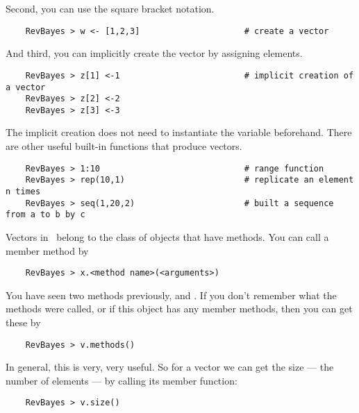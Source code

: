 Second, you can use the square bracket notation.
{\tt \begin{snugshade*}
\begin{lstlisting}    
    RevBayes > w <- [1,2,3]                     # create a vector
\end{lstlisting}
\end{snugshade*}}
And third, you can implicitly create the vector by assigning elements.
{\tt \begin{snugshade*}
\begin{lstlisting}    
    RevBayes > z[1] <-1                         # implicit creation of a vector
    RevBayes > z[2] <-2                   
    RevBayes > z[3] <-3                  
\end{lstlisting}
\end{snugshade*}} 
The implicit creation does not need to instantiate the variable beforehand.
There are other useful built-in functions that produce vectors.
{\tt \begin{snugshade*}
\begin{lstlisting}    
    RevBayes > 1:10                             # range function
    RevBayes > rep(10,1)                        # replicate an element n times
    RevBayes > seq(1,20,2)                      # built a sequence from a to b by c
\end{lstlisting}
\end{snugshade*}} 

Vectors in \Rev~belong to the class of objects that have methods.
You  can call a member method by
{\tt \begin{snugshade*}
\begin{lstlisting}    
    RevBayes > x.<method name>(<arguments>)                 
\end{lstlisting}
\end{snugshade*}} 
You have seen two methods previously,  and .
If you don't remember what the methods were called, or if this object has any member methods, then you can get these by
{\tt \begin{snugshade*}
\begin{lstlisting}    
    RevBayes > v.methods()                 
\end{lstlisting}
\end{snugshade*}} 
In general, this is very, very useful.
So for a vector we can get the size --- the number of elements --- by calling its member function:
{\tt \begin{snugshade*}
\begin{lstlisting}    
    RevBayes > v.size()                 
\end{lstlisting}
\end{snugshade*}} 


